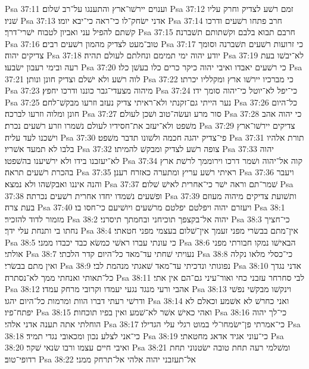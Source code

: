 Psa 37:11  וענוים יירשׁו־ארץ והתענגו על־רב שׁלום׃
Psa 37:12  זמם רשׁע לצדיק וחרק עליו שׁניו׃
Psa 37:13  אדני ישׂחק־לו כי־ראה כי־יבא יומו׃
Psa 37:14  חרב פתחו רשׁעים ודרכו קשׁתם להפיל עני ואביון לטבוח ישׁרי־דרך׃
Psa 37:15  חרבם תבוא בלבם וקשׁתותם תשׁברנה׃
Psa 37:16  טוב־מעט לצדיק מהמון רשׁעים רבים׃
Psa 37:17  כי זרועות רשׁעים תשׁברנה וסומך צדיקים יהוה׃
Psa 37:18  יודע יהוה ימי תמימם ונחלתם לעולם תהיה׃
Psa 37:19  לא־יבשׁו בעת רעה ובימי רעבון ישׂבעו׃
Psa 37:20  כי רשׁעים יאבדו ואיבי יהוה כיקר כרים כלו בעשׁן כלו׃
Psa 37:21  לוה רשׁע ולא ישׁלם וצדיק חונן ונותן׃
Psa 37:22  כי מברכיו יירשׁו ארץ ומקלליו יכרתו׃
Psa 37:23  מיהוה מצעדי־גבר כוננו ודרכו יחפץ׃
Psa 37:24  כי־יפל לא־יוטל כי־יהוה סומך ידו׃
Psa 37:25  נער הייתי גם־זקנתי ולא־ראיתי צדיק נעזב וזרעו מבקשׁ־לחם׃
Psa 37:26  כל־היום חונן ומלוה וזרעו לברכה׃
Psa 37:27  סור מרע ועשׂה־טוב ושׁכן לעולם׃
Psa 37:28  כי יהוה אהב משׁפט ולא־יעזב את־חסידיו לעולם נשׁמרו וזרע רשׁעים נכרת׃
Psa 37:29  צדיקים יירשׁו־ארץ וישׁכנו לעד עליה׃
Psa 37:30  פי־צדיק יהגה חכמה ולשׁונו תדבר משׁפט׃
Psa 37:31  תורת אלהיו בלבו לא תמעד אשׁריו׃
Psa 37:32  צופה רשׁע לצדיק ומבקשׁ להמיתו׃
Psa 37:33  יהוה לא־יעזבנו בידו ולא ירשׁיענו בהשׁפטו׃
Psa 37:34  קוה אל־יהוה ושׁמר דרכו וירוממך לרשׁת ארץ בהכרת רשׁעים תראה׃
Psa 37:35  ראיתי רשׁע עריץ ומתערה כאזרח רענן׃
Psa 37:36  ויעבר והנה איננו ואבקשׁהו ולא נמצא׃
Psa 37:37  שׁמר־תם וראה ישׁר כי־אחרית לאישׁ שׁלום׃
Psa 37:38  ופשׁעים נשׁמדו יחדו אחרית רשׁעים נכרתה׃
Psa 37:39  ותשׁועת צדיקים מיהוה מעוזם בעת צרה׃
Psa 37:40  ויעזרם יהוה ויפלטם יפלטם מרשׁעים ויושׁיעם כי־חסו בו׃
Psa 38:1  מזמור לדוד להזכיר׃
Psa 38:2  יהוה אל־בקצפך תוכיחני ובחמתך תיסרני׃
Psa 38:3  כי־חציך נחתו בי ותנחת עלי ידך׃
Psa 38:4  אין־מתם בבשׂרי מפני זעמך אין־שׁלום בעצמי מפני חטאתי׃
Psa 38:5  כי עונתי עברו ראשׁי כמשׂא כבד יכבדו ממני׃
Psa 38:6  הבאישׁו נמקו חבורתי מפני אולתי׃
Psa 38:7  נעויתי שׁחתי עד־מאד כל־היום קדר הלכתי׃
Psa 38:8  כי־כסלי מלאו נקלה ואין מתם בבשׂרי׃
Psa 38:9  נפוגותי ונדכיתי עד־מאד שׁאגתי מנהמת לבי׃
Psa 38:10  אדני נגדך כל־תאותי ואנחתי ממך לא־נסתרה׃
Psa 38:11  לבי סחרחר עזבני כחי ואור־עיני גם־הם אין אתי׃
Psa 38:12  אהבי ורעי מנגד נגעי יעמדו וקרובי מרחק עמדו׃
Psa 38:13  וינקשׁו מבקשׁי נפשׁי ודרשׁי רעתי דברו הוות ומרמות כל־היום יהגו׃
Psa 38:14  ואני כחרשׁ לא אשׁמע וכאלם לא יפתח־פיו׃
Psa 38:15  ואהי כאישׁ אשׁר לא־שׁמע ואין בפיו תוכחות׃
Psa 38:16  כי־לך יהוה הוחלתי אתה תענה אדני אלהי׃
Psa 38:17  כי־אמרתי פן־ישׂמחו־לי במוט רגלי עלי הגדילו׃
Psa 38:18  כי־אני לצלע נכון ומכאובי נגדי תמיד׃
Psa 38:19  כי־עוני אגיד אדאג מחטאתי׃
Psa 38:20  ואיבי חיים עצמו ורבו שׂנאי שׁקר׃
Psa 38:21  ומשׁלמי רעה תחת טובה ישׂטנוני תחת רדופי־טוב׃
Psa 38:22  אל־תעזבני יהוה אלהי אל־תרחק ממני׃
